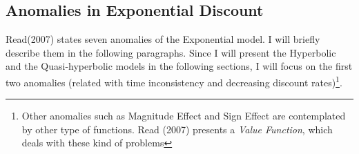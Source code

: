 \documentclass[]{article}
\begin{document}
\hypertarget{anomalies-in-exponential-discount}{%
\subsection{Anomalies in Exponential Discount}\label{anomalies-in-exponential-discount}}

Read(2007) states seven anomalies of the Exponential model. I will briefly describe them in the following paragraphs. Since I will present the Hyperbolic and the Quasi-hyperbolic models in the following sections, I will focus on the first two anomalies (related with time inconsistency and decreasing discount rates)\footnote{Other anomalies such as Magnitude Effect and Sign Effect are contemplated by other type of functions. Read (2007) presents a \emph{Value Function}, which deals with these kind of problems}.
\end{document}
